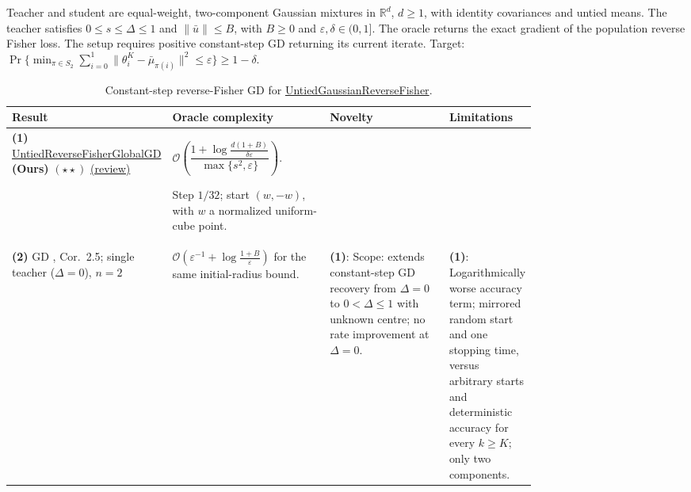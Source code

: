 \begin{table}[tp]
\centering
\caption{Constant-step reverse-Fisher GD for \href{https://github.com/k3nfalt/longtails/blob/main/LongTails/Setups/UntiedGaussianReverseFisher.lean}{UntiedGaussianReverseFisher}.}\label{tab:UntiedGaussianReverseFisher}
\parbox{\linewidth}{\footnotesize Teacher and student are equal-weight, two-component Gaussian mixtures in $\mathbb R^d$, $d\ge1$, with identity covariances and untied means. The teacher satisfies $0\le s\le\Delta\le1$ and $\|\bar u\|\le B$, with $B\ge0$ and $\varepsilon,\delta\in(0,1]$. The oracle returns the exact gradient of the population reverse Fisher loss. The setup requires positive constant-step GD returning its current iterate. Target: $\Pr\{\min_{\pi\in S_2}\sum_{i=0}^1\|\theta_i^K-\bar\mu_{\pi(i)}\|^2\le\varepsilon\}\ge1-\delta$.}\par\smallskip
\begin{threeparttable}
\footnotesize
\setlength{\tabcolsep}{4pt}\renewcommand{\arraystretch}{1.25}
\begin{tabularx}{\linewidth}{@{}>{\raggedright\arraybackslash}p{0.20\linewidth}>{\raggedright\arraybackslash}p{0.32\linewidth}>{\raggedright\arraybackslash}p{0.25\linewidth}>{\raggedright\arraybackslash}X@{}}
\toprule
\textbf{Result} & \textbf{Oracle complexity} & \textbf{Novelty} & \textbf{Limitations} \\
\midrule
\textbf{(1)} \href{https://github.com/k3nfalt/longtails/blob/main/LongTails/Theorems/UntiedReverseFisherGlobalGD.lean}{Untied\allowbreak Reverse\allowbreak Fisher\allowbreak Global\allowbreak GD} \textbf{(Ours)} $(\star\star)$ \href{https://github.com/k3nfalt/longtails/blob/main/scripts/reviews/UntiedReverseFisherGlobalGD.md}{(review)}
& $\mathcal{O}\!\left(\dfrac{1+\log\!\frac{d(1+B)}{\delta\varepsilon}}{\max\{s^2,\varepsilon\}}\right)$.\par Step $1/32$; start $(w,-w)$, with $w$ a normalized uniform-cube point. & & \\
\midrule[1.2pt]
\textbf{(2)} GD \citep{srfTyurin2026v1}, Cor.~2.5; single teacher ($\Delta=0$), $n=2$
& $\mathcal{O}\!\left(\varepsilon^{-1}+\log\!\frac{1+B}{\varepsilon}\right)$ for the same initial-radius bound.
& \textbf{(1)}: Scope: extends constant-step GD recovery from $\Delta=0$ to $0<\Delta\le1$ with unknown centre; no rate improvement at $\Delta=0$.
& \textbf{(1)}: Logarithmically worse accuracy term; mirrored random start and one stopping time, versus arbitrary starts and deterministic accuracy for every $k\ge K$; only two components. \\

\end{tabularx}
\end{threeparttable}
\end{table}

